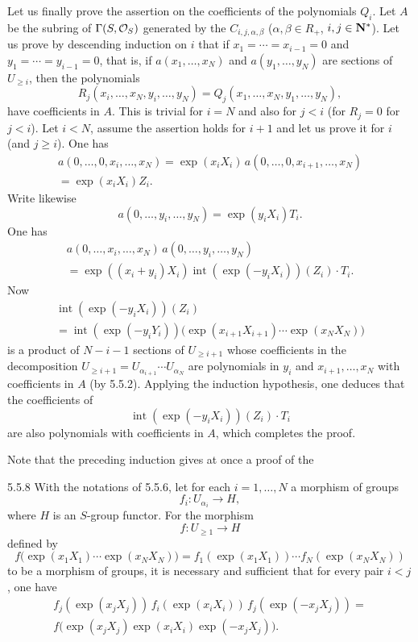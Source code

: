 Let us finally prove the assertion on the coefficients of the polynomials $Q_i$. Let $A$ be the subring of $\Gamma(S,\mathcal{O}_S)$ generated by the $C_{i,j,\alpha,\beta}$ ($\alpha,\beta\in R_+$, $i,j\in\mathbf{N}^*$). Let us prove by descending induction on $i$ that if $x_1=\cdots=x_{i-1}=0$ and $y_1=\cdots=y_{i-1}=0$, that is, if $a(x_1,\ldots,x_N)$ and $a(y_1,\ldots,y_N)$ are sections of $U_{\ge i}$, then the polynomials
\[
R_j(x_i,\ldots,x_N,y_i,\ldots,y_N)=Q_j(x_1,\ldots,x_N,y_1,\ldots,y_N),
\]
have coefficients in $A$. This is trivial for $i=N$ and also for $j<i$ (for $R_j=0$ for $j<i$). Let $i<N$, assume the assertion holds for $i+1$ and let us prove it for $i$ (and $j\ge i$). One has
\[
\begin{gathered}
a(0,\ldots,0,x_i,\ldots,x_N)=\exp(x_iX_i)\,a(0,\ldots,0,x_{i+1},\ldots,x_N)\\
=\exp(x_iX_i)Z_i.
\end{gathered}
\]
Write likewise
\[
a(0,\ldots,y_i,\ldots,y_N)=\exp(y_iX_i)T_i.
\]
One has
\[
\begin{gathered}
a(0,\ldots,x_i,\ldots,x_N)\,a(0,\ldots,y_i,\ldots,y_N)\\
=\exp((x_i+y_i)X_i)\operatorname{int}(\exp(-y_iX_i))(Z_i)\cdot T_i.
\end{gathered}
\]
Now
\[
\begin{gathered}
\operatorname{int}(\exp(-y_iX_i))(Z_i)\\
=\operatorname{int}(\exp(-y_iY_i))\bigl(\exp(x_{i+1}X_{i+1})\cdots\exp(x_NX_N)\bigr)
\end{gathered}
\]
is a product of $N-i-1$ sections of $U_{\ge i+1}$ whose coefficients in the decomposition $U_{\ge i+1}=U_{\alpha_{i+1}}\cdots U_{\alpha_N}$ are polynomials in $y_i$ and $x_{i+1},\ldots,x_N$ with coefficients in $A$ (by 5.5.2). Applying the induction hypothesis, one deduces that the coefficients of
\[
\operatorname{int}(\exp(-y_iX_i))(Z_i)\cdot T_i
\]
are also polynomials with coefficients in $A$, which completes the proof.

Note that the preceding induction gives at once a proof of the
\begin{lemma}{5.5.8}\label{XXII.5.5.8}
With the notations of 5.5.6, let for each $i=1,\ldots,N$ a morphism of groups
\[
f_i:U_{\alpha_i}\to H,
\]
where $H$ is an $S$-group functor. For the morphism
\[
f:U_{\ge1}\to H
\]
defined by
\[
f\bigl(\exp(x_1X_1)\cdots\exp(x_NX_N)\bigr)=f_1(\exp(x_1X_1))\cdots f_N(\exp(x_NX_N))
\]
to be a morphism of groups, it is necessary and sufficient that for every pair $i<j$, one have
\[
\begin{gathered}
f_j(\exp(x_jX_j))\,f_i(\exp(x_iX_i))\,f_j(\exp(-x_jX_j))=\\
f\bigl(\exp(x_jX_j)\exp(x_iX_i)\exp(-x_jX_j)\bigr).
\end{gathered}
\]
\end{lemma}

